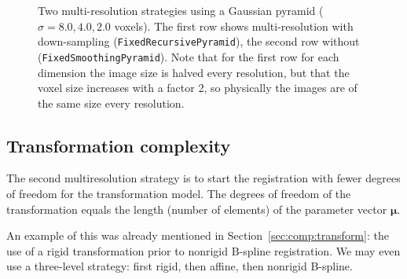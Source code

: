 \documentclass[]{report}
\newcommand{\vmu}{\bm{\mu}}
\begin{document}
\begin{figure}
\caption{Two multi-resolution strategies using a Gaussian pyramid
($\sigma = 8.0, 4.0, 2.0$ voxels). The first row shows
multi-resolution with down-sampling (\texttt{FixedRecursivePyramid}),
the second row without (\texttt{FixedSmoothingPyramid}). Note that
for the first row for each dimension the image size is halved every
resolution, but that the voxel size increases with a factor 2, so
physically the images are of the same size every resolution.}
\label{fig:multiresolution}
\end{figure}

\subsection{Transformation complexity}

The second multiresolution strategy is to start the registration
with fewer degrees of freedom for the transformation model. The
degrees of freedom of the transformation equals the length (number
of elements) of the parameter vector $\vmu$.

An example of this was already mentioned in
Section~\ref{sec:comp:transform}: the use of a rigid
transformation prior to nonrigid B-spline registration. We may
even use a three-level strategy: first rigid, then affine, then
nonrigid B-spline.
\end{document}
